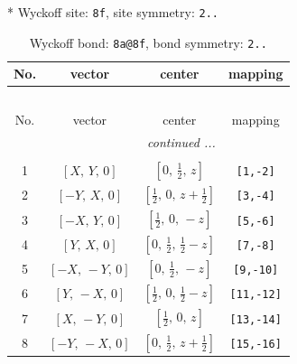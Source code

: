 \documentclass[fleqn,8pt]{jsarticle}
\begin{document}
* Wyckoff site: {\tt 8f}, site symmetry: {\tt 2..}
\renewcommand{\arraystretch}{1.2}
\begin{longtable}{cccc}
\caption{Wyckoff bond: {\tt 8a@8f}, bond symmetry: {\tt 2..}}
 \\
 \hline \hline
No. & vector & center & mapping \\ \hline \endfirsthead

\multicolumn{3}{l}{\tablename\ \thetable{}} \\
 \hline \hline
No. & vector & center & mapping \\ \hline \endhead

 \hline \hline
\multicolumn{3}{r}{\footnotesize\it continued ...} \\ \endfoot

 \hline \hline
\multicolumn{3}{r}{} \\ \endlastfoot

1 & $\left[ X,\, Y,\, 0 \right]$ & $\left[ 0,\, \frac{1}{2},\, z \right]$ & {\tt [1,-2]} \\ \hline
2 & $\left[ - Y,\, X,\, 0 \right]$ & $\left[ \frac{1}{2},\, 0,\, z + \frac{1}{2} \right]$ & {\tt [3,-4]} \\ \hline
3 & $\left[ - X,\, Y,\, 0 \right]$ & $\left[ \frac{1}{2},\, 0,\, - z \right]$ & {\tt [5,-6]} \\ \hline
4 & $\left[ Y,\, X,\, 0 \right]$ & $\left[ 0,\, \frac{1}{2},\, \frac{1}{2} - z \right]$ & {\tt [7,-8]} \\ \hline
5 & $\left[ - X,\, - Y,\, 0 \right]$ & $\left[ 0,\, \frac{1}{2},\, - z \right]$ & {\tt [9,-10]} \\ \hline
6 & $\left[ Y,\, - X,\, 0 \right]$ & $\left[ \frac{1}{2},\, 0,\, \frac{1}{2} - z \right]$ & {\tt [11,-12]} \\ \hline
7 & $\left[ X,\, - Y,\, 0 \right]$ & $\left[ \frac{1}{2},\, 0,\, z \right]$ & {\tt [13,-14]} \\ \hline
8 & $\left[ - Y,\, - X,\, 0 \right]$ & $\left[ 0,\, \frac{1}{2},\, z + \frac{1}{2} \right]$ & {\tt [15,-16]} \\
\end{longtable}
\renewcommand{\arraystretch}{1.2}
\end{document}
